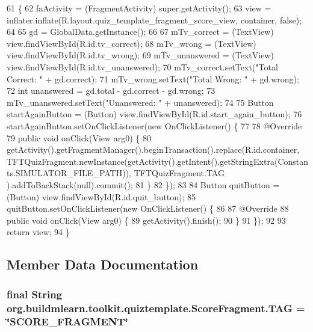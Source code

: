 \begin{DoxyCode}
61                                                                                                       \{
62         faActivity = (FragmentActivity) super.getActivity();
63         view = inflater.inflate(R.layout.quiz\_template\_fragment\_score\_view, container, \textcolor{keyword}{false});
64 
65         gd = GlobalData.getInstance();
66 
67         mTv\_correct = (TextView) view.findViewById(R.id.tv\_correct);
68         mTv\_wrong = (TextView) view.findViewById(R.id.tv\_wrong);
69         mTv\_unanswered = (TextView) view.findViewById(R.id.tv\_unanswered);
70         mTv\_correct.setText(\textcolor{stringliteral}{"Total Correct: "} + gd.correct);
71         mTv\_wrong.setText(\textcolor{stringliteral}{"Total Wrong: "} + gd.wrong);
72         \textcolor{keywordtype}{int} unanswered = gd.total - gd.correct - gd.wrong;
73         mTv\_unanswered.setText(\textcolor{stringliteral}{"Unanswered: "} + unanswered);
74 
75         Button startAgainButton = (Button) view.findViewById(R.id.start\_again\_button);
76         startAgainButton.setOnClickListener(\textcolor{keyword}{new} OnClickListener() \{
77 
78             @Override
79             \textcolor{keyword}{public} \textcolor{keywordtype}{void} onClick(View arg0) \{
80                 getActivity().getFragmentManager().beginTransaction().replace(R.id.container, 
      TFTQuizFragment.newInstance(getActivity().getIntent().getStringExtra(Constants.SIMULATOR\_FILE\_PATH)), TFTQuizFragment.TAG
      ).addToBackStack(null).commit();
81             \}
82         \});
83 
84         Button quitButton = (Button) view.findViewById(R.id.quit\_button);
85         quitButton.setOnClickListener(\textcolor{keyword}{new} OnClickListener() \{
86 
87             @Override
88             \textcolor{keyword}{public} \textcolor{keywordtype}{void} onClick(View arg0) \{
89                 getActivity().finish();
90             \}
91         \});
92 
93         \textcolor{keywordflow}{return} view;
94     \}
\end{DoxyCode}


\subsection{Member Data Documentation}
\hypertarget{classorg_1_1buildmlearn_1_1toolkit_1_1quiztemplate_1_1ScoreFragment_a0f33e1b8e2e8d4acddb6e2932dbd65ed}{
\subsubsection[{T\-A\-G}]{\setlength{\rightskip}{0pt plus 5cm}final String org.\-buildmlearn.\-toolkit.\-quiztemplate.\-Score\-Fragment.\-T\-A\-G = \char`\"{}S\-C\-O\-R\-E\-\_\-\-F\-R\-A\-G\-M\-E\-N\-T\char`\"{}\hspace{0.3cm}{\ttfamily [static]}}}\label{classorg_1_1buildmlearn_1_1toolkit_1_1quiztemplate_1_1ScoreFragment_a0f33e1b8e2e8d4acddb6e2932dbd65ed}



